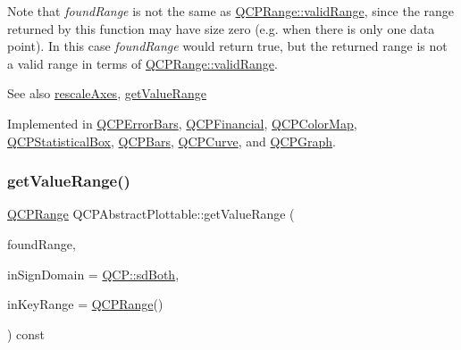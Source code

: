 Note that {\itshape found\+Range} is not the same as \mbox{\hyperlink{class_q_c_p_range_ab38bd4841c77c7bb86c9eea0f142dcc0}{Q\+C\+P\+Range\+::valid\+Range}}, since the range returned by this function may have size zero (e.\+g. when there is only one data point). In this case {\itshape found\+Range} would return true, but the returned range is not a valid range in terms of \mbox{\hyperlink{class_q_c_p_range_ab38bd4841c77c7bb86c9eea0f142dcc0}{Q\+C\+P\+Range\+::valid\+Range}}.

\begin{DoxySeeAlso}{See also}
\mbox{\hyperlink{class_q_c_p_abstract_plottable_a1491c4a606bccd2d09e65e11b79eb882}{rescale\+Axes}}, \mbox{\hyperlink{class_q_c_p_abstract_plottable_a4de773988b21ed090fddd27c6a3a3dcb}{get\+Value\+Range}} 
\end{DoxySeeAlso}


Implemented in \mbox{\hyperlink{class_q_c_p_error_bars_a6cac828a430d66ac77a167549d01d212}{Q\+C\+P\+Error\+Bars}}, \mbox{\hyperlink{class_q_c_p_financial_a15d68fb257113fef697356d65fa76559}{Q\+C\+P\+Financial}}, \mbox{\hyperlink{class_q_c_p_color_map_a985861974560f950af6cb7fae8c46267}{Q\+C\+P\+Color\+Map}}, \mbox{\hyperlink{class_q_c_p_statistical_box_a77d2d13301dfe60c13adfaa17fc1802f}{Q\+C\+P\+Statistical\+Box}}, \mbox{\hyperlink{class_q_c_p_bars_ac5a3854774d9d9cd129b1eae1426de2d}{Q\+C\+P\+Bars}}, \mbox{\hyperlink{class_q_c_p_curve_a22d09087f78f254731197cc0b8783299}{Q\+C\+P\+Curve}}, and \mbox{\hyperlink{class_q_c_p_graph_aac47c6189e3aea46ea46939e5d14796c}{Q\+C\+P\+Graph}}.

\mbox{\label{class_q_c_p_abstract_plottable_a4de773988b21ed090fddd27c6a3a3dcb}} 
\subsubsection{\texorpdfstring{getValueRange()}{getValueRange()}}
{\footnotesize\ttfamily \mbox{\hyperlink{class_q_c_p_range}{Q\+C\+P\+Range}} Q\+C\+P\+Abstract\+Plottable\+::get\+Value\+Range (\begin{DoxyParamCaption}\item[{bool \&}]{found\+Range,  }\item[{\mbox{\hyperlink{namespace_q_c_p_afd50e7cf431af385614987d8553ff8a9}{Q\+C\+P\+::\+Sign\+Domain}}}]{in\+Sign\+Domain = {\ttfamily \mbox{\hyperlink{namespace_q_c_p_afd50e7cf431af385614987d8553ff8a9aa38352ef02d51ddfa4399d9551566e24}{Q\+C\+P\+::sd\+Both}}},  }\item[{const \mbox{\hyperlink{class_q_c_p_range}{Q\+C\+P\+Range}} \&}]{in\+Key\+Range = {\ttfamily \mbox{\hyperlink{class_q_c_p_range}{Q\+C\+P\+Range}}()} }\end{DoxyParamCaption}) const\hspace{0.3cm}{\ttfamily [pure virtual]}}

